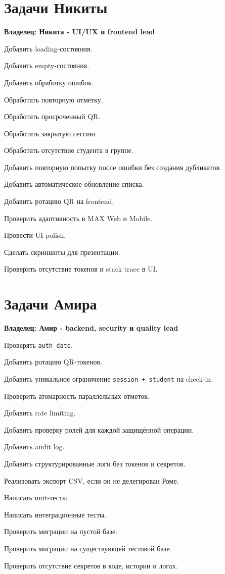 \documentclass[11pt,a4paper]{article}
\newcommand{\code}[1]{\texttt{#1}}\newcommand{\owner}[1]{\textcolor{MaxPurple}{\textbf{Владелец: #1}}}
\begin{document}
\section{Задачи Никиты}
\owner{Никита - UI/UX и frontend lead}
\begin{tasklist}
  \item Добавить loading-состояния.
  \item Добавить empty-состояния.
  \item Добавить обработку ошибок.
  \item Обработать повторную отметку.
  \item Обработать просроченный QR.
  \item Обработать закрытую сессию.
  \item Обработать отсутствие студента в группе.
  \item Добавить повторную попытку после ошибки без создания дубликатов.
  \item Добавить автоматическое обновление списка.
  \item Добавить ротацию QR на frontend.
  \item Проверить адаптивность в MAX Web и Mobile.
  \item Провести UI-polish.
  \item Сделать скриншоты для презентации.
  \item Проверить отсутствие токенов и stack trace в UI.
\end{tasklist}

\section{Задачи Амира}
\owner{Амир - backend, security и quality lead}
\begin{tasklist}
  \item Проверять \code{auth\_date}.
  \item Добавить ротацию QR-токенов.
  \item Добавить уникальное ограничение \code{session + student} на check-in.
  \item Проверить атомарность параллельных отметок.
  \item Добавить rate limiting.
  \item Добавить проверку ролей для каждой защищённой операции.
  \item Добавить audit log.
  \item Добавить структурированные логи без токенов и секретов.
  \item Реализовать экспорт CSV, если он не делегирован Роме.
  \item Написать unit-тесты.
  \item Написать интеграционные тесты.
  \item Проверить миграции на пустой базе.
  \item Проверить миграции на существующей тестовой базе.
  \item Проверить отсутствие секретов в коде, истории и логах.
\end{tasklist}
\end{document}
